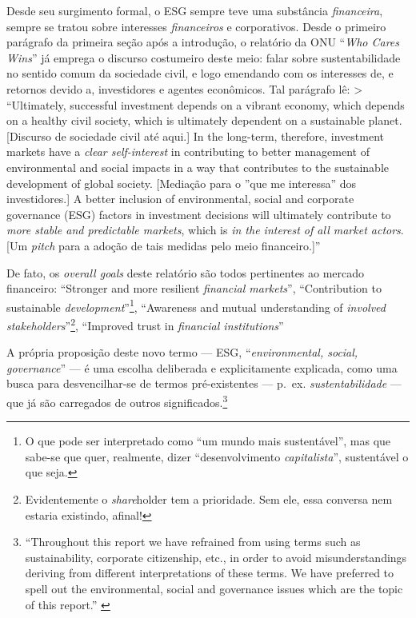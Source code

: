 \documentclass[12pt]{article}
\numberwithin{equation}{section}
\theoremstyle{plain}
\theoremstyle{definition}
\theoremstyle{remark}
\begin{document}
Desde seu surgimento formal, o ESG sempre teve uma substância \textit{financeira}, sempre se tratou sobre interesses \textit{financeiros} e corporativos. Desde o primeiro parágrafo da primeira seção após a introdução, o relatório da ONU ``\textit{Who Cares Wins}'' \parencite{GlobalCompact2004} já emprega o discurso costumeiro deste meio: falar sobre sustentabilidade no sentido comum da sociedade civil, e logo emendando com os interesses de, e retornos devido a, investidores e agentes econômicos. Tal parágrafo lê: \textgreater{} ``Ultimately, successful investment depends on a vibrant economy, which depends on a healthy civil society, which is ultimately dependent on a sustainable planet. {[}Discurso de sociedade civil até aqui.{]} In the long-term, therefore, investment markets have a \textit{clear self-interest} in contributing to better management of environmental and social impacts in a way that contributes to the sustainable development of global society. {[}Mediação para o ''que me interessa'' dos investidores.{]} A better inclusion of environmental, social and corporate governance (ESG) factors in investment decisions will ultimately contribute to \textit{more stable and predictable markets}, which is \textit{in the interest of all market actors}. {[}Um \textit{pitch} para a adoção de tais medidas pelo meio financeiro.{]}'' \parencite[, p. 3, grifo meu]{GlobalCompact2004}

De fato, os \textit{overall goals} deste relatório são todos pertinentes ao mercado financeiro: ``Stronger and more resilient \textit{financial markets}'', ``Contribution to sustainable \textit{development}''\footnote{O que pode ser interpretado como ``um mundo mais sustentável'', mas que sabe-se que quer, realmente, dizer ``desenvolvimento \textit{capitalista}'', sustentável o que seja.}, ``Awareness and mutual understanding of \textit{involved stakeholders}''\footnote{Evidentemente o \textit{share}holder tem a prioridade. Sem ele, essa conversa nem estaria existindo, afinal!}, ``Improved trust in \textit{financial institutions}'' \parencite[, p. v]{GlobalCompact2004}

A própria proposição deste novo termo --- ESG, ``\textit{environmental, social, governance}'' --- é uma escolha deliberada e explicitamente explicada, como uma busca para desvencilhar-se de termos pré-existentes --- p.~ex. \textit{sustentabilidade} --- que já são carregados de outros significados.\footnote{``Throughout this report we have refrained from using terms such as sustainability, corporate citizenship, etc., in order to avoid misunderstandings deriving from different interpretations of these terms. We have preferred to spell out the environmental, social and governance issues which are the topic of this report.'' \parencite[, p. 1-2]{GlobalCompact2004}}
\end{document}
